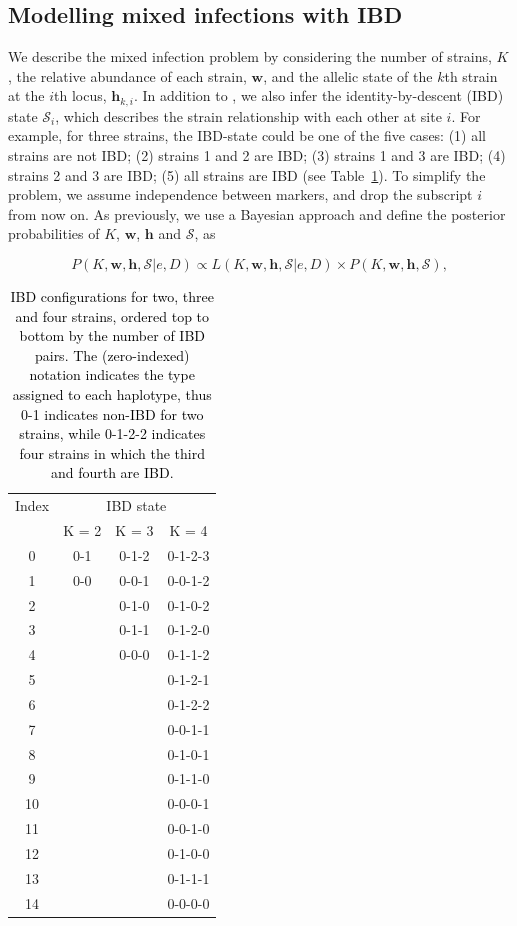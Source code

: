 \documentclass[9pt]{article}
\begin{document}
\subsection{Modelling mixed infections with IBD} \label{sect:prior}
We describe the mixed infection problem by considering the number of strains, $K$, the relative abundance of each strain, $\mathbf{w}$, and the allelic state of the $k$th strain at the $i$th locus, $\mathbf{h}_{k,i}$. In addition to \citet{Zhu2017}, we also infer the identity-by-descent (IBD) state $\mathcal{S}_{i}$, which describes the strain relationship with each other at site $i$. For example, for three strains, the IBD-state could be one of the five cases: (1) all strains are not IBD; (2) strains 1 and 2 are IBD; (3) strains 1 and 3 are IBD; (4) strains 2 and 3 are IBD; (5) all strains are IBD (see Table~\ref{tab:encode}). To simplify the problem, we assume independence between markers, and drop the subscript $i$ from now on. As previously, we use a Bayesian approach and define the posterior probabilities of $K$, $\mathbf{w}$, $\mathbf{h}$ and $\mathcal{S}$,  as

\begin{equation}
P(K, \mathbf{w}, \mathbf{h}, \mathcal{S}| e, D) \propto L(K, \mathbf{w}, \mathbf{h}, \mathcal{S} | e, D) \times P(K, \mathbf{w}, \mathbf{h}, \mathcal{S}), \label{eqn:post}
\end{equation}

\begin{table}
\centering
\begin{tabular}{c|ccc}
  Index & \multicolumn{3}{c}{IBD state} \\
    & K = 2& K = 3 & K = 4 \\ \hline
0   &0-1  & 0-1-2 & 0-1-2-3\\
1	  &0-0	&	0-0-1	& 0-0-1-2	\\
2	  &   	&	0-1-0	&0-1-0-2	\\
3	  &	  	&	0-1-1	&0-1-2-0	\\
4	  &		  &	0-0-0	&0-1-1-2	\\
5	  &		  &	    	&0-1-2-1	\\
6	  &	  	&		    &0-1-2-2	\\
7	  &	  	&		    &0-0-1-1	\\
8	  &	  	&	    	&0-1-0-1	\\
9	  &	  	&		    &0-1-1-0	\\
10	&	  	&		    &0-0-0-1	\\
11	&	  	&		    &0-0-1-0	\\
12	&		  &		    &0-1-0-0	\\
13	&	  	&		    &0-1-1-1	\\
14	&	  	&	    	&0-0-0-0	\\
\end{tabular}
\caption{\textcolor{black}{IBD configurations for two, three and four strains, ordered top to bottom by the number of IBD pairs. The (zero-indexed) notation indicates the type assigned to each haplotype, thus 0-1 indicates non-IBD for two strains, while 0-1-2-2 indicates four strains in which the third and fourth are IBD.} }\label{tab:encode}
\end{table}
\end{document}
